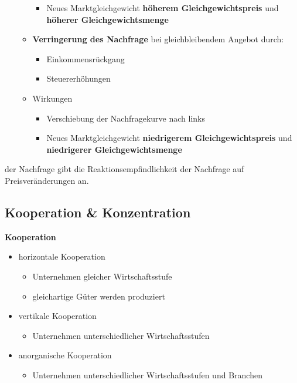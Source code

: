 \begin{itemize}
\begin{itemize}
\begin{itemize}
			\item Neues Marktgleichgewicht {\bf höherem Gleichgewichtspreis} und {\bf höherer Gleichgewichtsmenge}
		\end{itemize}
		\item {\bf Verringerung des Nachfrage} bei gleichbleibendem Angebot durch:
		\begin{itemize}
			\item Einkommensrückgang
			\item Steuererhöhungen
		\end{itemize}
		\item Wirkungen
		\begin{itemize}
			\item Verschiebung der Nachfragekurve nach links
			\item Neues Marktgleichgewicht {\bf niedrigerem Gleichgewichtspreis} und {\bf niedrigerer Gleichgewichtsmenge}
		\end{itemize}
	\end{itemize}
\end{itemize}


 der Nachfrage gibt die Reaktionsempfindlichkeit der Nachfrage auf Preisveränderungen an.


\subsection{Kooperation \& Konzentration}

{\bf Kooperation}
\begin{itemize}
\setlength\itemsep{0em}
	\item horizontale Kooperation
		\begin{itemize}
			\item Unternehmen gleicher Wirtschaftsstufe
			\item gleichartige Güter werden produziert
		\end{itemize}
	\item vertikale Kooperation
		\begin{itemize}
			\item Unternehmen unterschiedlicher Wirtschaftsstufen
		\end{itemize}
	\item anorganische Kooperation
		\begin{itemize}
			\item Unternehmen unterschiedlicher Wirtschaftsstufen und Branchen
		\end{itemize}
\end{itemize}

